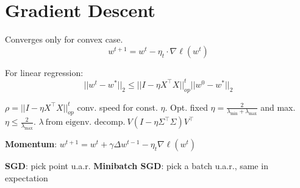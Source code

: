 \section*{Gradient Descent}
Converges only for convex case.
\[
	w^{t+1} = w^t - \eta_t \cdot \nabla \ell(w^t)
\]

For linear regression:
\[
	||w^t - w^*||_2 \leq ||I - \eta X^\top X||_{op}^t ||w^0 - w^*||_2
\]

$\rho = ||I - \eta X^\top X||_{op}^t$ conv. speed for const. $\eta$. Opt. fixed $\eta = \frac{2}
{\lambda_{\text{min}} + \lambda_{\text{max}}}$ and max. $\eta \leq \frac{2}{\lambda_{\text{max}}}$. 
$\lambda ~\text{from eigenv. decomp.} ~ V(I - \eta \Sigma^\top \Sigma)V^\top$

\textbf{Momentum}: $w^{t+1} = w^t + \gamma \Delta w^{t-1} - \eta_t \nabla \ell(w^t)$

\textbf{SGD}: pick point u.a.r.
\textbf{Minibatch SGD}: pick a batch u.a.r., same in expectation